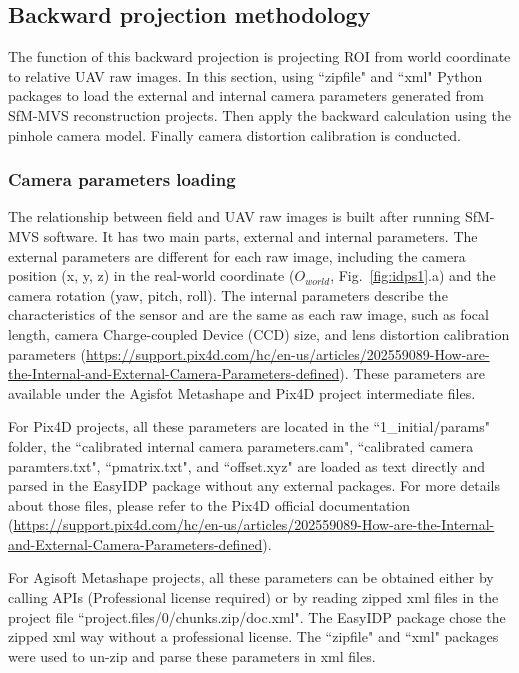 \subsection{Backward projection methodology}
\label{spp:backward}

% 

The function of this backward projection is projecting ROI from world coordinate to relative UAV raw images. In this section, using ``zipfile" and ``xml" Python packages to load the external and internal camera parameters generated from SfM-MVS reconstruction projects. Then apply the backward calculation using the pinhole camera model. Finally camera distortion calibration is conducted.

\subsubsection{Camera parameters loading}

The relationship between field and UAV raw images is built after running SfM-MVS software. It has two main parts, external and internal parameters. The external parameters are different for each raw image, including the camera position (x, y, z) in the real-world coordinate ($O_{world}$, Fig.~\ref{fig:idps1}.a) and the camera rotation (yaw, pitch, roll). The internal parameters describe the characteristics of the sensor and are the same as each raw image, such as focal length, camera Charge-coupled Device (CCD) size, and lens distortion calibration parameters (\url{https://support.pix4d.com/hc/en-us/articles/202559089-How-are-the-Internal-and-External-Camera-Parameters-defined}). These parameters are available under the Agisfot Metashape and Pix4D project intermediate files.

For Pix4D projects, all these parameters are located in the ``1\_initial/params" folder, the ``calibrated internal camera parameters.cam", ``calibrated camera paramters.txt", ``pmatrix.txt", and ``offset.xyz" are loaded as text directly and parsed in the EasyIDP package without any external packages. For more details about those files, please refer to the Pix4D official documentation (\url{https://support.pix4d.com/hc/en-us/articles/202559089-How-are-the-Internal-and-External-Camera-Parameters-defined}).

For Agisoft Metashape projects, all these parameters can be obtained either by calling APIs (Professional license required) or by reading zipped xml files in the project file ``project.files/0/chunks.zip/doc.xml". The EasyIDP package chose the zipped xml way without a professional license. The ``zipfile" and ``xml" packages were used to un-zip and parse these parameters in xml files.

